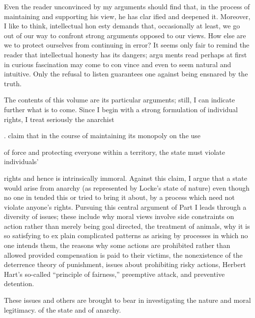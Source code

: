 \documentclass[11pt,openany]{book}
\begin{document}
Even the reader unconvinced by my arguments should find that, in the process of maintaining and supporting his view, he has clar ified and deepened it. Moreover, I like to think, intellectual hon esty demands that, occasionally at least, we go out of our way to confront strong arguments opposed to our views. How else are we to protect ourselves from continuing in error? It seems only fair to remind the reader that intellectual honesty has its dangers; argu ments read perhaps at first in curious fascination may come to con vince and even to seem natural and intuitive. Only the refusal to listen guarantees one against being ensnared by the truth. 

The contents of this volume are its particular arguments; still, I can indicate further what is to come. Since I begin with a strong formulation of individual rights, I treat seriously the anarchist 

. claim that in the course of maintaining its monopoly on the use

of force and protecting everyone within a territory, the state must violate individuals' 

rights and hence is intrinsically immoral. Against this claim, I argue that a state would arise from anarchy (as represented by Locke's state of nature) even though no one in tended this or tried to bring it about, by a process which need not violate anyone's rights. Pursuing this central argument of Part I leads through a diversity of issues; these include why moral views involve side constraints on action rather than merely being goal directed, the treatment of animals, why it is so satisfying to ex plain complicated patterns as arising by processes in which no one intends them, the reasons why some actions are prohibited rather than allowed provided compensation is paid to their victims, the nonexistence of the deterrence theory of punishment, issues about prohibiting risky actions, Herbert Hart's so-called ``principle of fairness,'' preemptive attack, and preventive detention. 

These issues and others are brought to bear in investigating the nature and moral legitimacy. of the state and of anarchy. 
\end{document}
